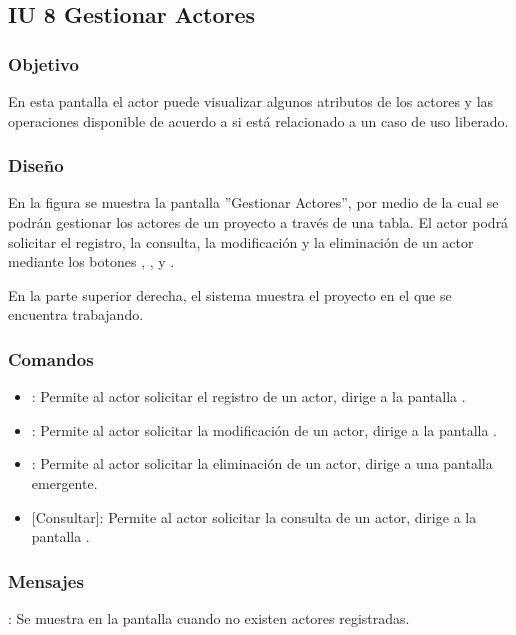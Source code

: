 \subsection{IU 8 Gestionar Actores}

\subsubsection{Objetivo}
	En esta pantalla el actor puede visualizar algunos atributos de los actores y las operaciones disponible de acuerdo a si está relacionado a un caso de uso liberado.
\subsubsection{Diseño}
	En la figura  se muestra la pantalla ''Gestionar Actores'', por medio de la cual se podrán gestionar los actores de un proyecto a través de una tabla. El actor podrá solicitar el registro, la consulta, la modificación y la eliminación de un actor mediante los botones , , \editar y \eliminar.
	
	En la parte superior derecha, el sistema muestra el proyecto en el que se encuentra trabajando.

\subsubsection{Comandos}
\begin{itemize}
	\item {}: Permite al actor solicitar el registro de un actor, dirige a la pantalla .
	\item \editar [Modificar]: Permite al actor solicitar la modificación de un actor, dirige a la pantalla .
	\item \eliminar [Eliminar]: Permite al actor solicitar la eliminación de un actor, dirige a una pantalla emergente.
	\item {} [Consultar]: Permite al actor solicitar la consulta de un actor, dirige a la pantalla  .
\end{itemize}
\subsubsection{Mensajes}

\begin{Citemize}
	\item {}: Se muestra en la pantalla  cuando no existen actores registradas.
\end{Citemize}
